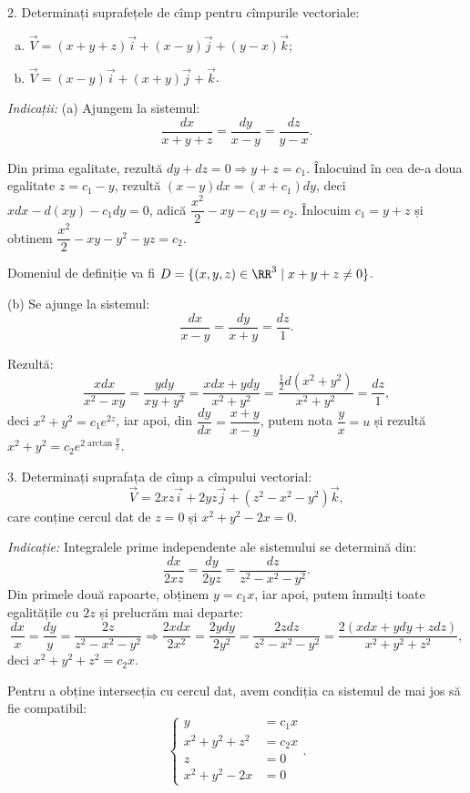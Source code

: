 \vspace{1cm}

2. Determinați suprafețele de cîmp pentru cîmpurile vectoriale:
\begin{enumerate}[(a)]
\item $ \vec{V} = (x + y + z)\vec{i} + (x - y)\vec{j} + (y - x)\vec{k} $;
\item $ \vec{V} = (x - y)\vec{i} + (x + y) \vec{j} + \vec{k} $.
\end{enumerate}

\emph{Indicații:} (a) Ajungem la sistemul:
\[
  \dfrac{dx}{x + y + z} = \dfrac{dy}{x - y} = \dfrac{dz}{y - x}.
\]

Din prima egalitate, rezultă $ dy + dz = 0 \Rightarrow y + z = c_1 $. Înlocuind
în cea de-a doua egalitate $ z = c_1 - y $, rezultă $ (x - y)dx = (x + c_1)dy $,
deci $ xdx - d(xy) - c_1 dy = 0 $, adică $ \dfrac{x^2}{2} - xy - c_1y = c_2 $. Înlocuim
$ c_1 = y + z $ și obtinem $ \dfrac{x^2}{2} - xy - y^2 - yz = c_2 $.

Domeniul de definiție va fi $ D = \{ (x, y, z) \in \RR^3 \mid x + y + z \neq 0 \} $.

(b) Se ajunge la sistemul:
\[
  \dfrac{dx}{x - y} = \dfrac{dy}{x + y} = \dfrac{dz}{1}.
\]

Rezultă:
\[
  \dfrac{xdx}{x^2 - xy} = \dfrac{ydy}{xy + y^2} = \dfrac{xdx + ydy}{x^2 + y^2} = %
  \dfrac{\frac{1}{2} d(x^2 + y^2)}{x^2 + y^2} = \dfrac{dz}{1},
\]
deci $ x^2 + y^2 = c_1 e^{2z} $, iar apoi, din $ \dfrac{dy}{dx} = \dfrac{x + y}{x - y} $,
putem nota $ \dfrac{y}{x} = u $ și rezultă $ x^2 + y^2 = c_2 e^{2 \arctan \frac{y}{x}} $.

\vspace{1cm}

3. Determinați suprafața de cîmp a cîmpului vectorial:
\[
  \vec{V} = 2xz\vec{i} + 2yz\vec{j} + (z^2 - x^2 - y^2)\vec{k},
\]
care conține cercul dat de $ z = 0 $ și $ x^2 + y^2 - 2x = 0 $.

\emph{Indicație:} Integralele prime independente ale sistemului se
determină din:
\[
  \dfrac{dx}{2xz} = \dfrac{dy}{2yz} = \dfrac{dz}{z^2 - x^2 - y^2}.
\]
Din primele două rapoarte, obținem $ y = c_1 x $, iar apoi, putem înmulți
toate egalitățile cu $ 2z $ și prelucrăm mai departe:
\[
  \dfrac{dx}{x} = \dfrac{dy}{y} = \dfrac{2z}{z^2 - x^2 - y^2} \Rightarrow %
  \dfrac{2xdx}{2x^2} = \dfrac{2ydy}{2y^2} = \dfrac{2zdz}{z^2 - x^2 - y^2} = %
  \dfrac{2(xdx + ydy + zdz)}{x^2 + y^2 + z^2},
\]
deci $ x^2 + y^2 + z^2 = c_2 x $.

Pentru a obține intersecția cu cercul dat, avem condiția ca sistemul de mai jos să fie
compatibil:
\[
  \begin{cases}
    y &= c_1 x \\
    x^2 + y^2 + z^2 &= c_2 x \\
    z &= 0 \\
    x^2 + y^2 - 2x &= 0
  \end{cases}.
\]

